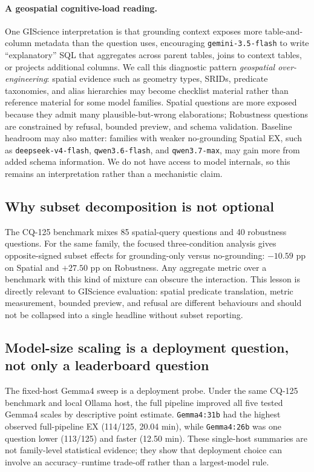 \documentclass[11pt]{article}
\begin{document}
\paragraph{A geospatial cognitive-load reading.} One GIScience interpretation is that grounding context exposes more table-and-column metadata than the question uses, encouraging \texttt{gemini-3.5-flash} to write ``explanatory'' SQL that aggregates across parent tables, joins to context tables, or projects additional columns. We call this diagnostic pattern \emph{geospatial over-engineering}: spatial evidence such as geometry types, SRIDs, predicate taxonomies, and alias hierarchies may become checklist material rather than reference material for some model families. Spatial questions are more exposed because they admit many plausible-but-wrong elaborations; Robustness questions are constrained by refusal, bounded preview, and schema validation. Baseline headroom may also matter: families with weaker no-grounding Spatial EX, such as \texttt{deepseek-v4-flash}, \texttt{qwen3.6-flash}, and \texttt{qwen3.7-max}, may gain more from added schema information. We do not have access to model internals, so this remains an interpretation rather than a mechanistic claim.

\subsection{Why subset decomposition is not optional}

The CQ-125 benchmark mixes 85 spatial-query questions and 40 robustness questions. For the same family, the focused three-condition analysis gives opposite-signed subset effects for grounding-only versus no-grounding: $-10.59$ pp on Spatial and $+27.50$ pp on Robustness. Any aggregate metric over a benchmark with this kind of mixture can obscure the interaction. This lesson is directly relevant to GIScience evaluation: spatial predicate translation, metric measurement, bounded preview, and refusal are different behaviours and should not be collapsed into a single headline without subset reporting.

\subsection{Model-size scaling is a deployment question, not only a leaderboard question}

The fixed-host Gemma4 sweep is a deployment probe. Under the same CQ-125 benchmark and local Ollama host, the full pipeline improved all five tested Gemma4 scales by descriptive point estimate. \texttt{Gemma4:31b} had the highest observed full-pipeline EX (114/125, 20.04 min), while \texttt{Gemma4:26b} was one question lower (113/125) and faster (12.50 min). These single-host summaries are not family-level statistical evidence; they show that deployment choice can involve an accuracy--runtime trade-off rather than a largest-model rule.
\end{document}

